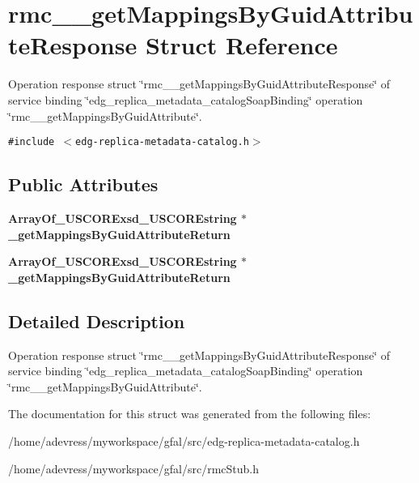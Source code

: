 \section{rmc\_\-\_\-get\-Mappings\-By\-Guid\-Attribute\-Response Struct Reference}
\label{structrmc____getMappingsByGuidAttributeResponse}
Operation response struct \char`\"{}rmc\_\-\_\-get\-Mappings\-By\-Guid\-Attribute\-Response\char`\"{} of service binding \char`\"{}edg\_\-replica\_\-metadata\_\-catalog\-Soap\-Binding\char`\"{} operation \char`\"{}rmc\_\-\_\-get\-Mappings\-By\-Guid\-Attribute\char`\"{}.  


{\tt \#include $<$edg-replica-metadata-catalog.h$>$}

\subsection*{Public Attributes}
\begin{CompactItemize}
\item 
\bf{Array\-Of\_\-USCORExsd\_\-USCOREstring} $\ast$ \textbf{\_\-get\-Mappings\-By\-Guid\-Attribute\-Return}\label{structrmc____getMappingsByGuidAttributeResponse_919fb007da4d660b00fb1ffa3f7adeda}

\item 
\bf{Array\-Of\_\-USCORExsd\_\-USCOREstring} $\ast$ \textbf{\_\-get\-Mappings\-By\-Guid\-Attribute\-Return}\label{structrmc____getMappingsByGuidAttributeResponse_919fb007da4d660b00fb1ffa3f7adeda}

\end{CompactItemize}


\subsection{Detailed Description}
Operation response struct \char`\"{}rmc\_\-\_\-get\-Mappings\-By\-Guid\-Attribute\-Response\char`\"{} of service binding \char`\"{}edg\_\-replica\_\-metadata\_\-catalog\-Soap\-Binding\char`\"{} operation \char`\"{}rmc\_\-\_\-get\-Mappings\-By\-Guid\-Attribute\char`\"{}. 



The documentation for this struct was generated from the following files:\begin{CompactItemize}
\item 
/home/adevress/myworkspace/gfal/src/edg-replica-metadata-catalog.h\item 
/home/adevress/myworkspace/gfal/src/rmc\-Stub.h\end{CompactItemize}
